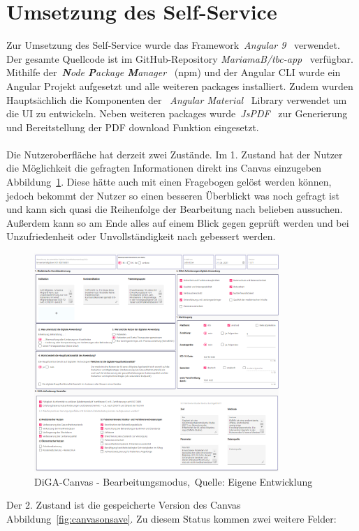 \section{Umsetzung des Self-Service}
Zur Umsetzung des Self-Service wurde das Framework~\textit{Angular 9}~\cite{angular} verwendet. Der gesamte Quellcode ist im GitHub-Repository \textit{MariamaB/tbc-app}~\cite{github_tbc} verfügbar. Mithilfe der~\textit{\textbf{N}ode \textbf{P}ackage \textbf{M}anager}~\cite{npm} (npm) und der Angular CLI wurde ein Angular Projekt aufgesetzt und alle weiteren packages installiert. Zudem wurden Hauptsächlich die Komponenten der ~\textit{Angular Material}~\cite{angularmaterial} Library verwendet um die UI zu entwickeln. Neben weiteren packages wurde~\textit{JsPDF}~\cite{jspdf} zur Generierung und Bereitstellung der PDF download Funktion eingesetzt.
\\\\
Die Nutzeroberfläche hat derzeit zwei Zustände. Im 1. Zustand hat der Nutzer die Möglichkeit die gefragten Informationen direkt ins Canvas einzugeben Abbildung~\ref{fig:canvasonedit}. Diese hätte auch mit einen Fragebogen gelöst werden können, jedoch bekommt der Nutzer so einen besseren Überblickt was noch gefragt ist und kann sich quasi die Reihenfolge der Bearbeitung nach belieben aussuchen. Außerdem kann so am Ende alles auf einem Blick gegen geprüft werden und bei Unzufriedenheit oder Unvollständigkeit nach gebessert werden.
\begin{figure}[H]
	\centering
	\includegraphics[width=350px, keepaspectratio]{assets/onEdit.png}
	\caption[DiGA-Canvas - Bearbeitungsmodus]{DiGA-Canvas - Bearbeitungsmodus,~Quelle: Eigene Entwicklung}
	\label{fig:canvasonedit}
\end{figure}
Der 2. Zustand ist die gespeicherte Version des Canvas Abbildung~\ref{fig:canvasonsave}. Zu diesem Status kommen zwei weitere Felder:
